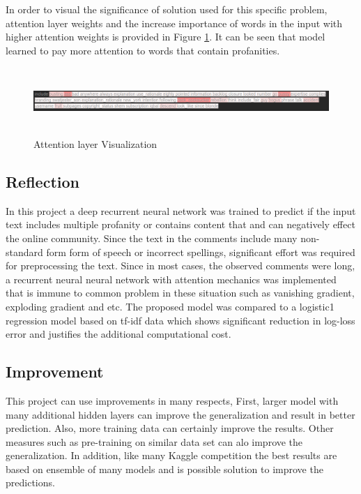 \documentclass{article}
\begin{document}
    In order to visual the significance of solution used for this specific problem, attention layer weights and the increase importance of words in the input with higher attention weights is provided in Figure \ref{fig:att_image}. It can be seen that model learned to pay more attention to words that contain profanities.

    \begin{figure}
        \centering
        \includegraphics[width=7in, height=1in]{att_image.png}
        \caption{Attention layer Visualization}
        \label{fig:att_image}
    \end{figure}



    \subsection{Reflection}

    In this project a deep recurrent neural network was trained to predict if the input text includes multiple profanity or contains content that and can negatively effect the online community. Since the text in the comments include many non-standard form form of speech or incorrect spellings, significant effort was required for preprocessing the text. Since in most cases, the observed comments were long, a recurrent neural neural network with attention mechanics was implemented that is immune to common problem in these situation such as vanishing gradient, exploding gradient and etc. The proposed model was compared to a logistic1 regression model based on tf-idf data which shows significant reduction in log-loss error and justifies the additional computational cost.


    \subsection{Improvement}
    This project can use improvements in many respects, First, larger model with many additional hidden layers can improve the generalization and result in better prediction. Also, more training data can certainly improve the results. Other measures such as pre-training on similar data set can alo improve the generalization. In addition, like many Kaggle competition the best results are based on ensemble of many models and is possible solution to improve the predictions.




\end{document}
